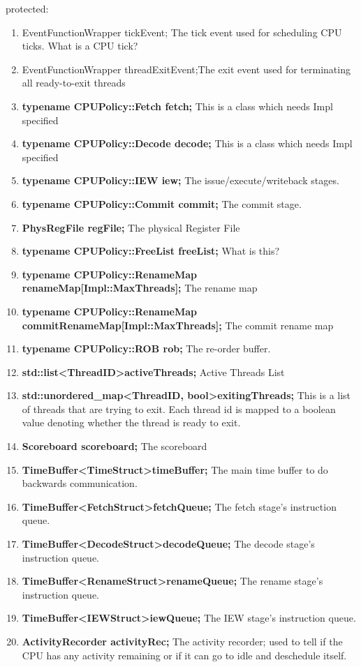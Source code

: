 \documentclass[11pt]{article}
\begin{document}
\begin{enumerate}
		protected:
			\begin{enumerate}[label={\arabic*.}]
				\item EventFunctionWrapper tickEvent; The tick event used for scheduling CPU ticks. What is a CPU tick?
				\item EventFunctionWrapper threadExitEvent;The exit event used for terminating all ready-to-exit threads
				\item \textbf{typename CPUPolicy::Fetch fetch;} This is a class which needs Impl specified
				\item \textbf{typename CPUPolicy::Decode decode;} This is a class which needs Impl specified
				\item \textbf{typename CPUPolicy::IEW iew;} The issue/execute/writeback stages.
				\item \textbf{typename CPUPolicy::Commit commit;} The commit stage.
				\item \textbf{PhysRegFile regFile;} The physical Register File
				\item \textbf{typename CPUPolicy::FreeList freeList;} What is this?
				\item \textbf{typename CPUPolicy::RenameMap renameMap[Impl::MaxThreads];} The rename map
				\item \textbf{typename CPUPolicy::RenameMap commitRenameMap[Impl::MaxThreads];} The commit rename map
				\item \textbf{typename CPUPolicy::ROB rob;} The re-order buffer.
				\item \textbf{std::list\textless ThreadID\textgreater activeThreads;} Active Threads List
				\item \textbf{std::unordered\_map\textless ThreadID, bool\textgreater exitingThreads;} This is a list of threads that are trying to exit. Each thread id is mapped to a boolean value denoting whether the thread is ready to exit.
				\item \textbf{Scoreboard scoreboard;} The scoreboard
				\item \textbf{TimeBuffer\textless TimeStruct\textgreater timeBuffer;} The main time buffer to do backwards communication.
				\item \textbf{TimeBuffer\textless FetchStruct\textgreater fetchQueue;} The fetch stage's instruction queue.
				\item \textbf{TimeBuffer\textless DecodeStruct\textgreater decodeQueue;} The decode stage's instruction queue.
				\item \textbf{TimeBuffer\textless RenameStruct\textgreater renameQueue;} The rename stage's instruction queue.
				\item \textbf{TimeBuffer\textless IEWStruct\textgreater iewQueue;} The IEW stage's instruction queue.
				\item \textbf{ActivityRecorder activityRec;} The activity recorder; used to tell if the CPU has any activity remaining or if it can go to idle and deschedule itself.
				


\end{enumerate}
\end{enumerate}
\end{document}
